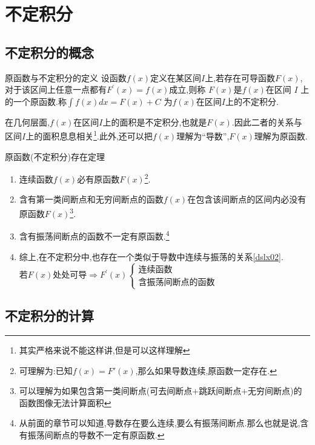 \documentclass[8pt a4paper, oneside, UTF8]{ctexbook}
\begin{document}
\begin{sloppypar}
    \else
    \fi
    \chapter{不定积分}

    \section{不定积分的概念}
    \begin{defn}{原函数与不定积分的定义}{}
        设函数$f(x)$定义在某区间$I$上,若存在可导函数$F(x)$,对于该区间上任意一点都有$F^\prime(x)=f(x)$成立,则称 $F(x)$是$f(x)$在区间 $I$ 上的一个原函数.称$\int f(x)dx=F(x)+C$ 为$f(x)$在区间$I$上的不定积分.
    \end{defn}
    在几何层面,$f(x)$在区间$I$上的面积是不定积分,也就是$F(x)$.因此二者的关系与区间$I$上的面积息息相关\footnote{其实严格来说不能这样讲,但是可以这样理解}.此外,还可以把$f(x)$理解为“导数”,$F(x)$理解为原函数.
    \begin{them}{原函数(不定积分)存在定理}{}
        \begin{enumerate}
            \item 连续函数$f(x)$必有原函数$F(x)$\footnote{可理解为:已知$f(x)=F'(x)$,那么如果导数连续,原函数一定存在.}.
            \item 含有第一类间断点和无穷间断点的函数$f(x)$在包含该间断点的区间内必没有原函数$F(x)$\footnote{可以理解为如果包含第一类间断点(可去间断点+跳跃间断点+无穷间断点)的函数图像无法计算面积}.
            \item 含有振荡间断点的函数不一定有原函数.\footnote{从前面的章节可以知道,导数存在要么连续,要么有振荡间断点.那么也就是说,含有振荡间断点的导数不一定有原函数.}
            \item 综上,在不定积分中,也存在一个类似于导数中连续与振荡的关系\ref{dslx02}.\\若$F(x)$处处可导$\Rightarrow F^{\prime}(x)
                      \begin{cases}
                          \text{连续函数} \\
                          \text{含振荡间断点的函数}
                      \end{cases}$
        \end{enumerate}
    \end{them}
    \section{不定积分的计算}

\end{sloppypar}
\end{document}
